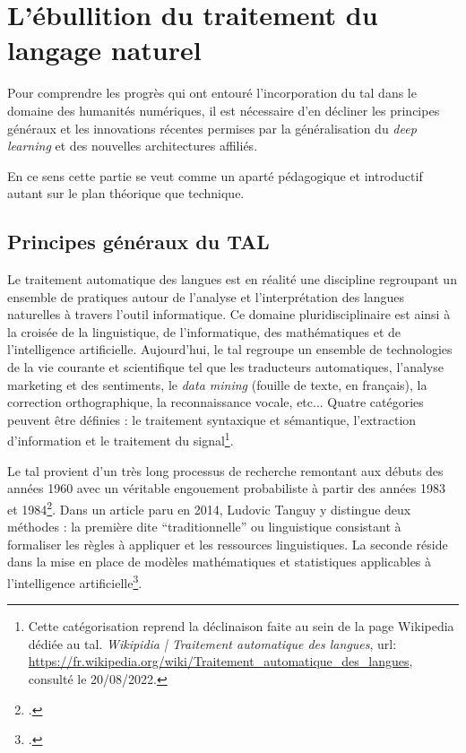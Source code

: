 	
	\section{L'ébullition du traitement du langage naturel}
	
	Pour comprendre les progrès qui ont entouré l'incorporation du \gls{tal} dans le domaine des humanités numériques, il est nécessaire d'en décliner les principes généraux et les innovations récentes permises par la généralisation du \textit{deep learning} et des nouvelles architectures affiliés.
	
	En ce sens cette partie se veut comme un aparté pédagogique et introductif autant sur le plan théorique que technique.
	
	\subsection{Principes généraux du TAL}
	
	Le traitement automatique des langues est en réalité une discipline regroupant un ensemble de pratiques autour de l'analyse et l'interprétation des langues naturelles à travers l'outil informatique. Ce domaine pluridisciplinaire est ainsi à la croisée de la linguistique, de l’informatique, des mathématiques et de l’intelligence artificielle. Aujourd'hui, le \gls{tal} regroupe un ensemble de technologies de la vie courante et scientifique tel que les traducteurs automatiques, l'analyse marketing et des sentiments, le \textit{data mining} (fouille de texte, en français), la correction orthographique, la reconnaissance vocale, etc... Quatre catégories peuvent être définies : le traitement syntaxique et sémantique, l'extraction d'information et le traitement du signal\footnote{Cette catégorisation reprend la déclinaison faite au sein de la page Wikipedia dédiée au \gls{tal}. \textit{Wikipidia | Traitement automatique des langues}, url: \url{https://fr.wikipedia.org/wiki/Traitement_automatique_des_langues}, consulté le 20/08/2022.}.
	
	Le \gls{tal} provient d'un très long processus de recherche remontant aux débuts des années 1960 avec un véritable engouement probabiliste à partir des années 1983 et 1984\footcite[Cette éclosion d'intérêt au sein des milieux scientifiques est permis avec la publication des premiers arbres de décisions et de d'un système d'étiquetage probabiliste.][]{tanguyEvolutionsLinguistiqueOutillee2014}. Dans un article paru en 2014, Ludovic Tanguy y distingue deux méthodes : la première dite \enquote{traditionnelle} ou linguistique consistant à formaliser les règles à appliquer et les ressources linguistiques. La seconde réside dans la mise en place de modèles mathématiques et statistiques applicables à l'intelligence artificielle\footcite{tanguyEvolutionsLinguistiqueOutillee2014}.
	
